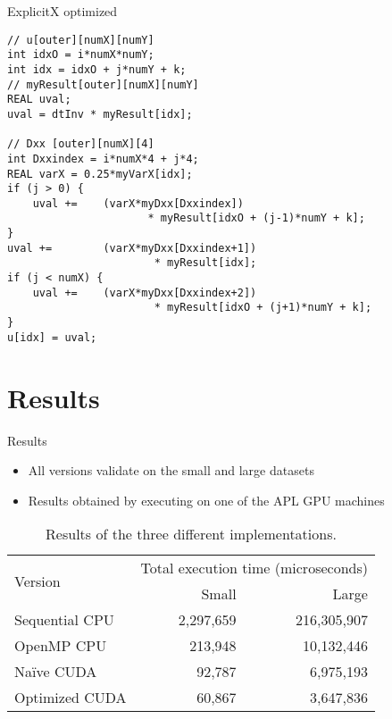 \documentclass[14pt,t,english]{beamer}
\begin{document}
%
\begin{frame}[fragile]{ExplicitX optimized}

\begin{lstlisting}
// u[outer][numX][numY]
int idxO = i*numX*numY;
int idx = idxO + j*numY + k;
// myResult[outer][numX][numY]
REAL uval;
uval = dtInv * myResult[idx];

// Dxx [outer][numX][4]
int Dxxindex = i*numX*4 + j*4;
REAL varX = 0.25*myVarX[idx];
if (j > 0) {
    uval +=    (varX*myDxx[Dxxindex])
                      * myResult[idxO + (j-1)*numY + k];
}
uval +=        (varX*myDxx[Dxxindex+1])
                       * myResult[idx];
if (j < numX) {
    uval +=    (varX*myDxx[Dxxindex+2])
                       * myResult[idxO + (j+1)*numY + k];
}
u[idx] = uval;
\end{lstlisting}
\end{frame}
\section{Results}
\begin{frame}[c]{Results}
\begin{itemize}
\item All versions validate on the small and large datasets
\item Results obtained by executing on one of the APL GPU machines
\end{itemize}
\begingroup
	\fontsize{10pt}{12pt}\selectfont
\begin{table}[h]
\centering
\begin{tabular}{l r r}
\toprule
\multirow{2}{*}{Version}        & \multicolumn{2}{c}{Total execution time (microseconds)} \\
                    & Small     & Large \\
\midrule
Sequential CPU      & 2,297,659   & 216,305,907 \\
OpenMP CPU          & 213,948    & 10,132,446  \\
Na\"ive CUDA        & 92,787     & 6,975,193   \\
Optimized CUDA      & 60,867     & 3,647,836   \\
\bottomrule
\end{tabular}
\caption{Results of the three different implementations.}
\end{table}
\endgroup
\end{frame}

%


\end{document}
